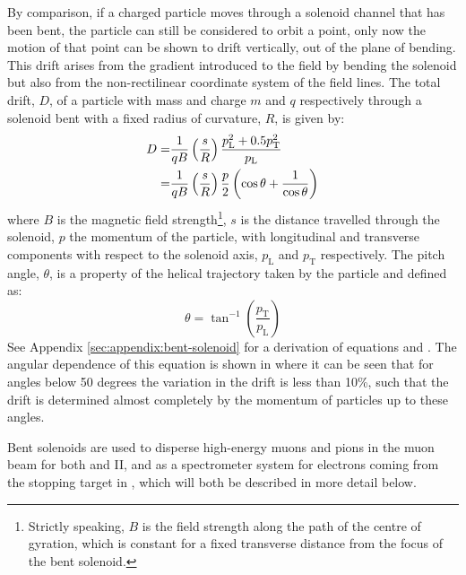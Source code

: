 By comparison, if a charged particle moves through a solenoid channel that has been bent, the particle can still be considered to orbit a point, only now 
the motion of that point can be shown to drift vertically, out of the plane of bending.  This drift arises from the gradient introduced to the field by bending the solenoid but also from the 
non-rectilinear coordinate system of the field lines.  
The total drift, $D$, of a particle with mass and charge $m$ and $q$ respectively  through a solenoid bent with a fixed radius of curvature, $R$, is given by:
\begin{align}
	D=&\frac{1}{qB}\left(\frac{s}{R}\right)\frac{p^2_\mathrm{L}+0.5p^2_\mathrm{T}}{p_\mathrm{L}}\eqlabel{detector:bent-solenoids:longVstrans}\\
	 =&\frac{1}{qB}\left(\frac{s}{R}\right)\frac{p}{2}\left(\cos\theta + \frac{1}{\cos\theta}\right)\eqlabel{detector:bent-solenoids:pitchAngle}
\end{align}
where $B$ is the magnetic field strength\footnote{Strictly speaking, $B$ is the field strength along the path of the centre of gyration, which is constant for a fixed transverse distance from the focus of the bent solenoid.},
$s$ is the distance travelled through the solenoid, $p$ the momentum of the particle, with longitudinal and transverse components with respect to the solenoid axis, $p_\mathrm{L}$ and $p_\mathrm{T}$ respectively.
The pitch angle, $\theta$, is a property of the helical trajectory taken by the particle and defined as:
\begin{equation}
\theta=\tan^{-1}\left(\frac{p_\mathrm{T}}{p_\mathrm{L}}\right)
\end{equation}
See Appendix \ref{sec:appendix:bent-solenoid} for a derivation of equations  and .
The angular dependence of this equation is shown in  where it can be seen that for angles below 50 degrees the variation in the drift is less than 10\%, such that the drift is determined almost completely by the momentum of particles up to these angles.

Bent solenoids are used to disperse high-energy muons and pions in the muon
beam for both \phaseI and II, and as a spectrometer system for electrons coming
from the stopping target in \phaseII, which will both be described in more
detail below.

